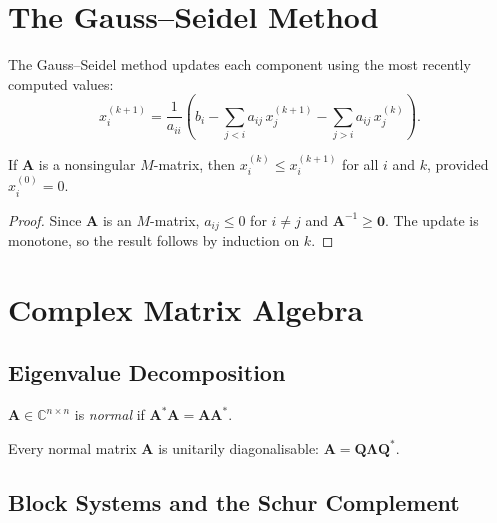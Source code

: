 \documentclass[
    language=english,
    doctype=lecture-notes,
    institution=none,
]{../../omnilatex}
\begin{document}
\section{The Gauss--Seidel Method}

The Gauss--Seidel method updates each component using the most recently
computed values:
\[
    x_i^{(k+1)} = \frac{1}{a_{ii}} \left(
        b_i - \sum_{j<i} a_{ij}\,x_j^{(k+1)}
              - \sum_{j>i} a_{ij}\,x_j^{(k)}
    \right).
\]

\begin{lemma}\label{lem:gs-monotone}
If $\mathbf{A}$ is a nonsingular $M$-matrix, then $x_i^{(k)} \leq
x_i^{(k+1)}$ for all $i$ and $k$, provided $x_i^{(0)} = 0$.
\end{lemma}

\begin{proof}
Since $\mathbf{A}$ is an $M$-matrix, $a_{ij} \leq 0$ for $i \neq j$ and
$\mathbf{A}^{-1} \geq \mathbf{0}$. The update is monotone, so the result
follows by induction on $k$.
\end{proof}

\section{Complex Matrix Algebra}

\subsection{Eigenvalue Decomposition}

\begin{definition}\label{def:normal}
$\mathbf{A} \in \mathbb{C}^{n \times n}$ is \emph{normal} if
$\mathbf{A}^*\mathbf{A} = \mathbf{A}\mathbf{A}^*$.
\end{definition}

\begin{theorem}\label{thm:spectral}
Every normal matrix $\mathbf{A}$ is unitarily diagonalisable:
$\mathbf{A} = \mathbf{Q}\boldsymbol{\Lambda}\mathbf{Q}^*$.
\end{theorem}

\subsection{Block Systems and the Schur Complement}
\end{document}
